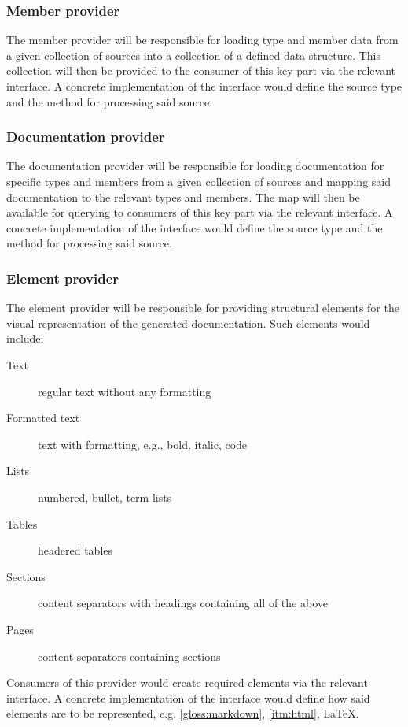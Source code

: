 \subsubsection{Member provider}

The member provider will be responsible for loading type and member data from a given collection of sources into a collection of a defined data structure.
This collection will then be provided to the consumer of this key part via the relevant interface.
A concrete implementation of the interface would define the source type and the method for processing said source.

\subsubsection{Documentation provider}

The documentation provider will be responsible for loading documentation for specific types and members from a given collection of sources and mapping said documentation to the relevant types and members.
The map will then be available for querying to consumers of this key part via the relevant interface.
A concrete implementation of the interface would define the source type and the method for processing said source.

\subsubsection{Element provider} \label{sec:elementProvider}

The element provider will be responsible for providing structural elements for the visual representation of the generated documentation. Such elements would include:
\begin{description}
    \item[Text] regular text without any formatting
    \item[Formatted text] text with formatting, e.g., bold, italic, code
    \item[Lists] numbered, bullet, term lists
    \item[Tables] headered tables
    \item[Sections] content separators with headings containing all of the above
    \item[Pages] content separators containing sections
\end{description}

Consumers of this provider would create required elements via the relevant interface.
A concrete implementation of the interface would define how said elements are to be represented, e.g. \ref{gloss:markdown}, \ref{itm:html}, \LaTeX.

